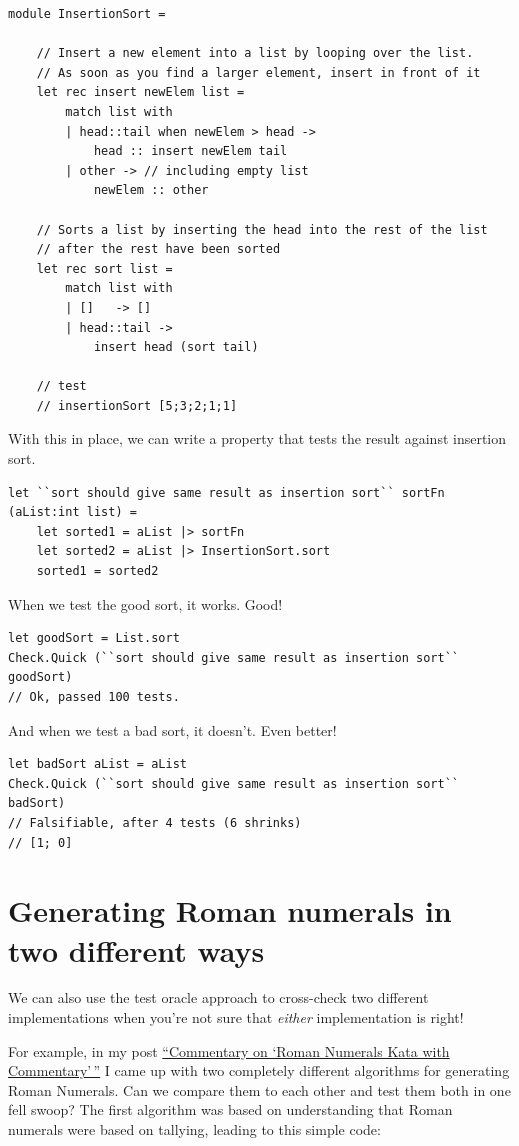 \begin{verbatim}
module InsertionSort = 
	
	// Insert a new element into a list by looping over the list.
	// As soon as you find a larger element, insert in front of it
	let rec insert newElem list = 
		match list with 
		| head::tail when newElem > head -> 
			head :: insert newElem tail
		| other -> // including empty list
			newElem :: other 

	// Sorts a list by inserting the head into the rest of the list 
	// after the rest have been sorted
	let rec sort list = 
		match list with
		| []   -> []
		| head::tail -> 
			insert head (sort tail)

	// test
	// insertionSort [5;3;2;1;1]
\end{verbatim}
With this in place, we can write a property that tests the result
against insertion sort.

\begin{verbatim}
let ``sort should give same result as insertion sort`` sortFn (aList:int list) = 
	let sorted1 = aList |> sortFn 
	let sorted2 = aList |> InsertionSort.sort
	sorted1 = sorted2 
\end{verbatim}
When we test the good sort, it works. Good!

\begin{verbatim}
let goodSort = List.sort
Check.Quick (``sort should give same result as insertion sort`` goodSort)
// Ok, passed 100 tests.
\end{verbatim}
And when we test a bad sort, it doesn't. Even better!

\begin{verbatim}
let badSort aList = aList 
Check.Quick (``sort should give same result as insertion sort`` badSort)
// Falsifiable, after 4 tests (6 shrinks) 
// [1; 0]
\end{verbatim}


\section{Generating Roman numerals in two different
ways}\label{generating-roman-numerals-in-two-different-ways}

We can also use the test oracle approach to cross-check two different
implementations when you're not sure that \emph{either} implementation
is right!

For example, in my post \href{/posts/roman-numeral-kata/}{``Commentary
on `Roman Numerals Kata with Commentary'\,''} I came up with two
completely different algorithms for generating Roman Numerals. Can we
compare them to each other and test them both in one fell swoop?
The first algorithm was based on understanding that Roman numerals were
based on tallying, leading to this simple code:

